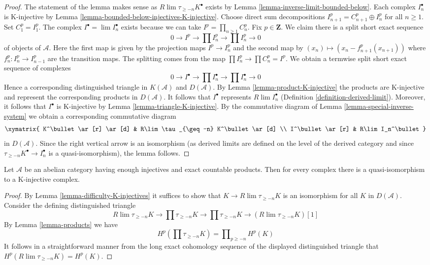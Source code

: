 \begin{proof}
The statement of the lemma makes sense as $R\lim \tau_{\geq -n}K^\bullet$
exists by Lemma \ref{lemma-inverse-limit-bounded-below}.
Each complex $I_n^\bullet$ is K-injective by
Lemma \ref{lemma-bounded-below-injectives-K-injective}.
Choose direct sum decompositions $I_{n + 1}^p = C_{n + 1}^p \oplus I_n^p$
for all $n \geq 1$. Set $C_1^p = I_1^p$. The complex
$I^\bullet = \lim I_n^\bullet$ exists because we can take
$I^p = \prod_{n \geq 1} C_n^p$. Fix $p \in \mathbf{Z}$.
We claim there is a split short exact sequence
$$
0 \to I^p \to \prod I_n^p \to \prod I_n^p \to 0
$$
of objects of $\mathcal{A}$. Here the first map is given by
the projection maps $I^p \to I_n^p$ and the second map
by $(x_n) \mapsto (x_n - f^p_{n + 1}(x_{n + 1}))$ where
$f^p_n : I_n^p \to I_{n - 1}^p$ are the transition maps.
The splitting comes from the map $\prod I_n^p \to \prod C_n^p = I^p$.
We obtain a termwise split short exact sequence of complexes
$$
0 \to I^\bullet \to \prod I_n^\bullet \to \prod I_n^\bullet \to 0
$$
Hence a corresponding distinguished triangle in $K(\mathcal{A})$
and $D(\mathcal{A})$. By Lemma \ref{lemma-product-K-injective}
the products are K-injective and represent the corresponding
products in $D(\mathcal{A})$.
It follows that $I^\bullet$ represents $R\lim I_n^\bullet$
(Definition \ref{definition-derived-limit}).
Moreover, it follows that $I^\bullet$ is K-injective by
Lemma \ref{lemma-triangle-K-injective}.
By the commutative diagram of Lemma \ref{lemma-special-inverse-system}
we obtain a corresponding commutative diagram
$$
\xymatrix{
K^\bullet \ar[r] \ar[d] & R\lim \tau_{\geq -n} K^\bullet \ar[d] \\
I^\bullet \ar[r] & R\lim I_n^\bullet
}
$$
in $D(\mathcal{A})$. Since the right vertical arrow is an isomorphism
(as derived limits are defined on the level of the derived category
and since $\tau_{\geq -n}K^\bullet \to I_n^\bullet$ is a quasi-isomorphism),
the lemma follows.
\end{proof}

\begin{lemma}
\label{lemma-enough-K-injectives-Ab4-star}
Let $\mathcal{A}$ be an abelian category having enough injectives
and exact countable products. Then for every complex
there is a quasi-isomorphism to a K-injective complex.
\end{lemma}

\begin{proof}
By Lemma \ref{lemma-difficulty-K-injectives} it suffices to show that
$K \to R\lim\tau_{\geq -n}K$ is an isomorphism for all $K$ in $D(\mathcal{A})$.
Consider the defining distinguished triangle
$$
R\lim\tau_{\geq -n}K \to
\prod \tau_{\geq -n}K \to
\prod \tau_{\geq -n}K \to
(R\lim\tau_{\geq -n}K)[1]
$$
By Lemma \ref{lemma-products} we have
$$
H^p(\prod \tau_{\geq -n}K) = \prod\nolimits_{p \geq -n} H^p(K)
$$
It follows in a straightforward manner from the long exact cohomology
sequence of the displayed distinguished triangle
that $H^p(R\lim \tau_{\geq -n}K) = H^p(K)$.
\end{proof}




